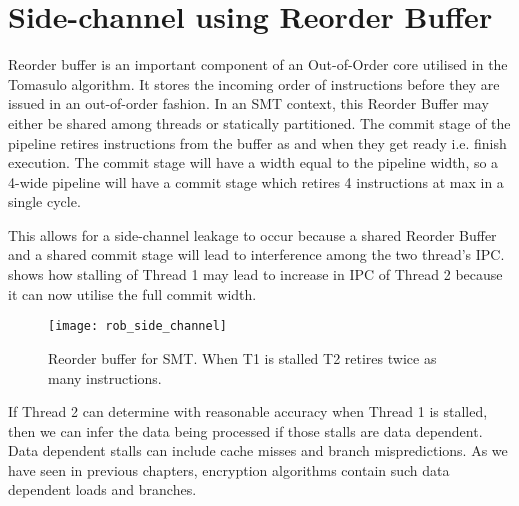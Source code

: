 \chapter{Side-channel using Reorder Buffer}


Reorder buffer is an important component of an Out-of-Order core utilised in the
Tomasulo algorithm. It stores the incoming order of instructions before they
are issued in an out-of-order fashion. In an SMT context, this Reorder Buffer
may either be shared among threads or statically partitioned. The commit
stage of the pipeline retires instructions from the buffer as and when they get
ready i.e. finish execution. The commit stage will have a width equal
to the pipeline width, so a 4-wide pipeline will have a commit stage which
retires 4 instructions at max in a single cycle.

This allows for a side-channel leakage to occur because a shared Reorder Buffer
and a shared commit stage will lead to interference among the two thread's IPC.
 shows how stalling of Thread 1 may lead to increase in IPC of Thread 2 because it can now utilise the full commit width.

\begin{figure}
    \centering
    \texttt{[image: rob\_side\_channel]}
    \caption{Reorder buffer for SMT. When T1 is stalled T2 retires twice as
    many instructions.}
    \label{rob_attack}
\end{figure}

If Thread 2 can determine with reasonable accuracy when Thread 1 is stalled,
then we can infer the data being processed if those stalls are data dependent.
Data dependent stalls can include cache misses and branch mispredictions.
As we have seen in previous chapters, encryption algorithms contain such
data dependent loads and branches.
